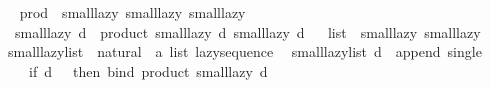 \begin{isabellebody}
\isanewline
{}\isamarkupfalse%
%
\isadelimproof
\ %
\endisadelimproof
%
\isatagproof
\isacommand{{\isachardot}{\kern0pt}{\isachardot}{\kern0pt}}\isamarkupfalse%
%
\endisatagproof
{\isafoldproof}%
%
\isadelimproof
%
\endisadelimproof
\isanewline
\isanewline
{}\isamarkupfalse%
\isanewline
\isanewline
{}\isamarkupfalse%
\ prod\ {\isacharcolon}{\kern0pt}{\isacharcolon}{\kern0pt}\ {\isacharparenleft}{\kern0pt}small{\isacharunderscore}{\kern0pt}lazy{\isacharcomma}{\kern0pt}\ small{\isacharunderscore}{\kern0pt}lazy{\isacharparenright}{\kern0pt}\ small{\isacharunderscore}{\kern0pt}lazy\isanewline
{}\isanewline
\isanewline
{}\isamarkupfalse%
\isanewline
\ \ {\isachardoublequoteopen}small{\isacharunderscore}{\kern0pt}lazy\ d\ {\isacharequal}{\kern0pt}\ product\ {\isacharparenleft}{\kern0pt}small{\isacharunderscore}{\kern0pt}lazy\ d{\isacharparenright}{\kern0pt}\ {\isacharparenleft}{\kern0pt}small{\isacharunderscore}{\kern0pt}lazy\ d{\isacharparenright}{\kern0pt}{\isachardoublequoteclose}\isanewline
\isanewline
{}\isamarkupfalse%
%
\isadelimproof
\ %
\endisadelimproof
%
\isatagproof
\isacommand{{\isachardot}{\kern0pt}{\isachardot}{\kern0pt}}\isamarkupfalse%
%
\endisatagproof
{\isafoldproof}%
%
\isadelimproof
%
\endisadelimproof
\isanewline
\isanewline
{}\isamarkupfalse%
\isanewline
\isanewline
{}\isamarkupfalse%
\ list\ {\isacharcolon}{\kern0pt}{\isacharcolon}{\kern0pt}\ {\isacharparenleft}{\kern0pt}small{\isacharunderscore}{\kern0pt}lazy{\isacharparenright}{\kern0pt}\ small{\isacharunderscore}{\kern0pt}lazy\isanewline
{}\isanewline
\isanewline
{}\isamarkupfalse%
\ small{\isacharunderscore}{\kern0pt}lazy{\isacharunderscore}{\kern0pt}list\ {\isacharcolon}{\kern0pt}{\isacharcolon}{\kern0pt}\ {\isachardoublequoteopen}natural\ {\isasymRightarrow}\ {\isacharprime}{\kern0pt}a\ list\ lazy{\isacharunderscore}{\kern0pt}sequence{\isachardoublequoteclose}\isanewline
{}\isanewline
\ \ {\isachardoublequoteopen}small{\isacharunderscore}{\kern0pt}lazy{\isacharunderscore}{\kern0pt}list\ d\ {\isacharequal}{\kern0pt}\ append\ {\isacharparenleft}{\kern0pt}single\ {\isacharbrackleft}{\kern0pt}{\isacharbrackright}{\kern0pt}{\isacharparenright}{\kern0pt}\isanewline
\ \ \ \ {\isacharparenleft}{\kern0pt}if\ d\ {\isachargreater}{\kern0pt}\ {}\ then\ bind\ {\isacharparenleft}{\kern0pt}product\ {\isacharparenleft}{\kern0pt}small{\isacharunderscore}{\kern0pt}lazy\ {\isacharparenleft}{\kern0pt}d\ {\isacharminus}{\kern0pt}\ {}{\isacharparenright}{\kern0pt}{\isacharparenright}{\kern0pt}\isanewline

\end{isabellebody}
